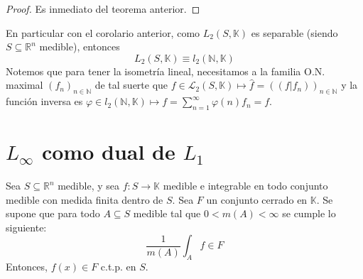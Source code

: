 \documentclass[12pt]{report}
\newcounter{it}
\theoremstyle{largebreak}
\newcommand\cf[3]{\ensuremath{#1:#2\rightarrow#3}}
\newcommand\pint[2]{\ensuremath{\left(#1\big| #2\right)}}
\begin{document}
    \begin{proof}
        Es inmediato del teorema anterior.
    \end{proof}

    \begin{exa}
        En particular con el corolario anterior, como $L_2(S,\mathbb{K})$ es separable (siendo $S\subseteq\mathbb{R}^n$ medible), entonces
        \begin{equation*}
            L_2(S,\mathbb{K}) \equiv l_2(\mathbb{N},\mathbb{K})
        \end{equation*}
        Notemos que para tener la isometría lineal, necesitamos a la familia O.N. maximal $(f_n)_{ n\in\mathbb{N}}$ de tal suerte que $f\in\mathcal{L}_2(S,\mathbb{K})\mapsto \hat{f}=(\pint{f}{f_n})_{n\in\mathbb{N} }$ y la función inversa es $\varphi\in l_2(\mathbb{N},\mathbb{K})\mapsto f=\sum_{ n=1}^{\infty}\varphi(n)f_n=f$.
    \end{exa}

    \section{$L_\infty$ como dual de $L_1$}

    \begin{lema}
        Sea $S\subseteq\mathbb{R}^n$ medible, y sea $\cf{f}{S}{\mathbb{K}}$ medible e integrable en todo conjunto medible con medida finita dentro de $S$. Sea $F$ un conjunto cerrado en $\mathbb{K}$. Se supone que para todo $A\subseteq S$ medible tal que $0<m(A)<\infty$ se cumple lo siguiente:
        \begin{equation*}
            \frac{1}{m(A)}\int_A f\in F
        \end{equation*}
        Entonces, $f(x)\in F$ c.t.p. en $S$.
    \end{lema}
\end{document}

